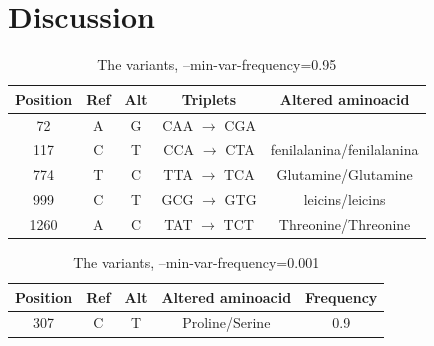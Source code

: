 \documentclass{article}
\begin{document}
\section{Discussion}


		\begin{table}
	\centering
	\begin{tabular}{|c|c|c|c|c|}
		\hline
  Position & Ref  & Alt & Triplets & Altered aminoacid\\
	 \hline
	 72 & A & G & CAA $\rightarrow$ CGA &  \\
		\hline
		  117  & C & T & CCA  $\rightarrow$  CTA & fenilalanina/fenilalanina\\
		\hline
		 774  & T & C & TTA $\rightarrow$   TCA & Glutamine/Glutamine\\
		\hline
	 999  & C & T & GCG  $\rightarrow$  GTG & leicins/leicins\\
		\hline
		  1260 & A & C & TAT  $\rightarrow$  TCT & Threonine/Threonine\\
		\hline
	\end{tabular}
	\caption{ The variants, --min-var-frequency=0.95 }
\end{table}


\begin{table}
	\centering
	\begin{tabular}{|c|c|c|c|c|}
		\hline
		 Position & Ref & Alt & Altered aminoacid & Frequency\\
		\hline
		  307 & C & T & Proline/Serine & 0.9\\
		\hline
		\hline
	\end{tabular}
	\caption{ The variants,  --min-var-frequency=0.001 }
\end{table}
\end{document}
